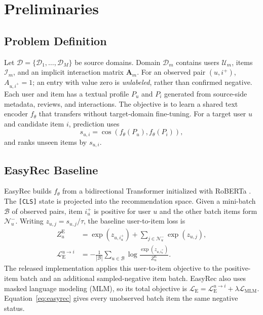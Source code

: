 \documentclass[11pt]{article}
\begin{document}
\section{Preliminaries}

\subsection{Problem Definition}

Let $\mathcal{D}=\{\mathcal{D}_1,\ldots,\mathcal{D}_M\}$ be source domains.
Domain $\mathcal{D}_m$ contains users $\mathcal{U}_m$, items $\mathcal{I}_m$, and an implicit interaction matrix $\mathbf{A}_m$.
For an observed pair $(u,i^+)$, $A_{u,i^+}=1$; an entry with value zero is \emph{unlabeled}, rather than confirmed negative.
Each user and item has a textual profile $P_u$ and $P_i$ generated from source-side metadata, reviews, and interactions.
The objective is to learn a shared text encoder $f_\theta$ that transfers without target-domain fine-tuning.
For a target user $u$ and candidate item $i$, prediction uses
\begin{equation}
s_{u,i}=\cos\!\left(f_\theta(P_u),f_\theta(P_i)\right),
\end{equation}
and ranks unseen items by $s_{u,i}$.

\subsection{EasyRec Baseline}

EasyRec builds $f_\theta$ from a bidirectional Transformer initialized with RoBERTa \citep{liu2019roberta}.
The \texttt{[CLS]} state is projected into the recommendation space.
Given a mini-batch $\mathcal{B}$ of observed pairs, item $i_u^+$ is positive for user $u$ and the other batch items form $\mathcal{N}_u^-$.
Writing $z_{u,j}=s_{u,j}/\tau$, the baseline user-to-item loss is
\begin{equation}
\begin{aligned}
Z_u^{\mathrm{E}} &=
\exp(z_{u,i_u^+})+
\sum_{j\in\mathcal{N}_u^-}\exp(z_{u,j}),\\
\mathcal{L}_{\mathrm{E}}^{u\rightarrow i}
&=-\frac{1}{|\mathcal{B}|}\sum_{u\in\mathcal{B}}
\log\frac{\exp(z_{u,i_u^+})}{Z_u^{\mathrm{E}}}.
\end{aligned}
\label{eq:easyrec}
\end{equation}
The released implementation applies this user-to-item objective to the
positive-item batch and an additional sampled-negative item batch.
EasyRec also uses masked language modeling (MLM), so its total objective is
$\mathcal{L}_{\mathrm{E}}=\mathcal{L}_{\mathrm{E}}^{u\rightarrow i}
+\lambda\mathcal{L}_{\mathrm{MLM}}$.
Equation~\ref{eq:easyrec} gives every unobserved batch item the same negative status.
\end{document}
